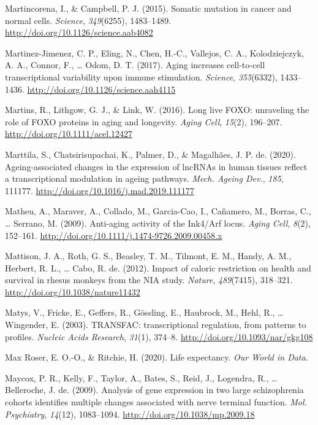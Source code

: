 \documentclass[12pt,twoside]{unicam}
\begin{document}
\begin{cslreferences}
\leavevmode\hypertarget{ref-Martincorena2015}{}%
Martincorena, I., \& Campbell, P. J. (2015). Somatic mutation in cancer and normal cells. \emph{Science}, \emph{349}(6255), 1483--1489. \url{http://doi.org/10.1126/science.aab4082}

\leavevmode\hypertarget{ref-Martinez-Jimenez2017}{}%
Martinez-Jimenez, C. P., Eling, N., Chen, H.-C., Vallejos, C. A., Kolodziejczyk, A. A., Connor, F., \ldots{} Odom, D. T. (2017). Aging increases cell-to-cell transcriptional variability upon immune stimulation. \emph{Science}, \emph{355}(6332), 1433--1436. \url{http://doi.org/10.1126/science.aah4115}

\leavevmode\hypertarget{ref-Martins2016}{}%
Martins, R., Lithgow, G. J., \& Link, W. (2016). Long live FOXO: unraveling the role of FOXO proteins in aging and longevity. \emph{Aging Cell}, \emph{15}(2), 196--207. \url{http://doi.org/10.1111/acel.12427}

\leavevmode\hypertarget{ref-Marttila2020}{}%
Marttila, S., Chatsirisupachai, K., Palmer, D., \& Magalhães, J. P. de. (2020). Ageing-associated changes in the expression of lncRNAs in human tissues reflect a transcriptional modulation in ageing pathways. \emph{Mech. Ageing Dev.}, \emph{185}, 111177. \url{http://doi.org/10.1016/j.mad.2019.111177}

\leavevmode\hypertarget{ref-Matheu2009}{}%
Matheu, A., Maraver, A., Collado, M., Garcia-Cao, I., Cañamero, M., Borras, C., \ldots{} Serrano, M. (2009). Anti-aging activity of the Ink4/Arf locus. \emph{Aging Cell}, \emph{8}(2), 152--161. \url{http://doi.org/10.1111/j.1474-9726.2009.00458.x}

\leavevmode\hypertarget{ref-Mattison2012}{}%
Mattison, J. A., Roth, G. S., Beasley, T. M., Tilmont, E. M., Handy, A. M., Herbert, R. L., \ldots{} Cabo, R. de. (2012). Impact of caloric restriction on health and survival in rhesus monkeys from the NIA study. \emph{Nature}, \emph{489}(7415), 318--321. \url{http://doi.org/10.1038/nature11432}

\leavevmode\hypertarget{ref-Matys2003}{}%
Matys, V., Fricke, E., Geffers, R., Gössling, E., Haubrock, M., Hehl, R., \ldots{} Wingender, E. (2003). TRANSFAC: transcriptional regulation, from patterns to profiles. \emph{Nucleic Acids Research}, \emph{31}(1), 374--8. \url{http://doi.org/10.1093/nar/gkg108}

\leavevmode\hypertarget{ref-Roser2020}{}%
Max Roser, E. O.-O., \& Ritchie, H. (2020). Life expectancy. \emph{Our World in Data}.

\leavevmode\hypertarget{ref-Maycox2009}{}%
Maycox, P. R., Kelly, F., Taylor, A., Bates, S., Reid, J., Logendra, R., \ldots{} Belleroche, J. de. (2009). Analysis of gene expression in two large schizophrenia cohorts identifies multiple changes associated with nerve terminal function. \emph{Mol. Psychiatry}, \emph{14}(12), 1083--1094. \url{http://doi.org/10.1038/mp.2009.18}


\end{cslreferences}
\end{document}
